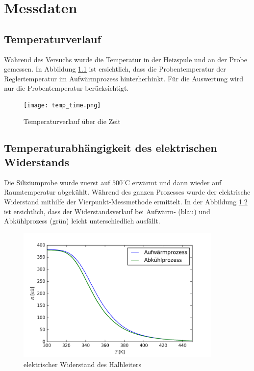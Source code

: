 \documentclass[a4paper,parskip,11pt, DIV12]{scrreprt}
\begin{document}
\newpage

\chapter{Messdaten}

\section{Temperaturverlauf}
Während des Versuchs wurde die Temperatur in der Heizspule und an der Probe gemessen. In Abbildung \ref{temp_time} ist ersichtlich, dass die Probentemperatur der Reglertemperatur im Aufwärmprozess hinterherhinkt. Für die Auswertung wird nur die Probentemperatur berücksichtigt.
%
\begin{figure}[htbp]
\centering
\texttt{[image: temp\_time.png]}
\caption{Temperaturverlauf über die Zeit}
\label{temp_time}
\end{figure}
%

\section{Temperaturabhängigkeit des elektrischen Widerstands}
Die Siliziumprobe wurde zuerst auf $500^{\circ}$C erwärmt und dann wieder auf Raumtemperatur abgekühlt. Während des ganzen Prozesses wurde der elektrische Widerstand mithilfe der Vierpunkt-Messmethode ermittelt. In der Abbildung \ref{res_temp} ist ersichtlich, dass der Widerstandsverlauf bei Aufwärm- (blau) und Abkühlprozess (grün) leicht unterschiedlich ausfällt.
%
\begin{figure}[htbp]
\centering
\includegraphics[width=0.9\textwidth]{res_temp.png}
\caption{elektrischer Widerstand des Halbleiters}
\label{res_temp}
\end{figure}
%
\end{document}

